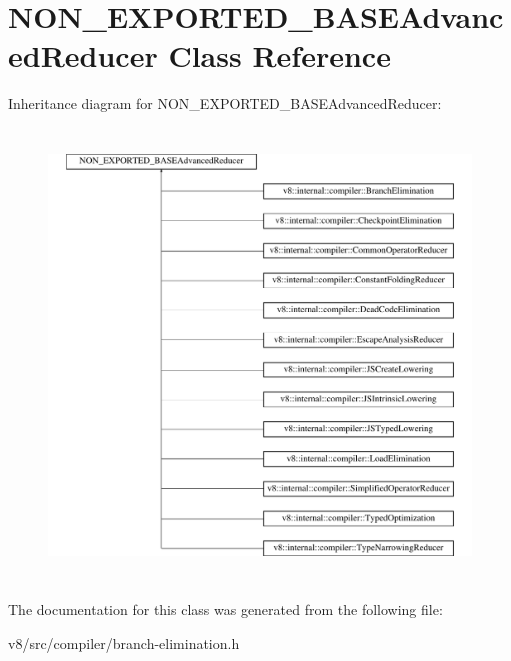 \hypertarget{classNON__EXPORTED__BASEAdvancedReducer}{}\section{N\+O\+N\+\_\+\+E\+X\+P\+O\+R\+T\+E\+D\+\_\+\+B\+A\+S\+E\+Advanced\+Reducer Class Reference}
\label{classNON__EXPORTED__BASEAdvancedReducer}
Inheritance diagram for N\+O\+N\+\_\+\+E\+X\+P\+O\+R\+T\+E\+D\+\_\+\+B\+A\+S\+E\+Advanced\+Reducer\+:\begin{figure}[H]
\begin{center}
\leavevmode
\includegraphics[height=12.000000cm]{classNON__EXPORTED__BASEAdvancedReducer}
\end{center}
\end{figure}


The documentation for this class was generated from the following file\+:\begin{DoxyCompactItemize}
\item 
v8/src/compiler/branch-\/elimination.\+h\end{DoxyCompactItemize}
